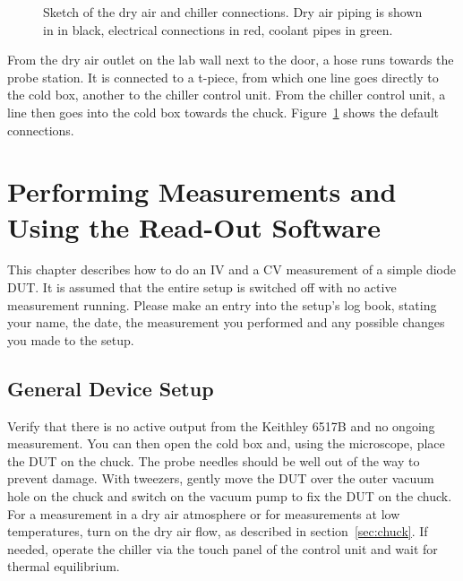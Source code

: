 \documentclass[a4paper]{article}
\begin{document}
\begin{figure}[hbtp!]
\caption[Dry Air and Chiller Connections]{Sketch of the dry air and chiller connections. Dry air piping is shown in in black, electrical connections in red, coolant pipes in green.}
\label{fig:dryair}
\end{figure}

From the dry air outlet on the lab wall next to the door, a hose runs towards the probe station.
It is connected to a t-piece, from which one line goes directly to the cold box, another to the chiller control unit.
From the chiller control unit, a line then goes into the cold box towards the chuck.
Figure~\ref{fig:dryair} shows the default connections.\\

\newpage

\section{Performing Measurements and Using the Read-Out Software}
\label{sec:meas}

This chapter describes how to do an IV and a CV measurement of a simple diode DUT.
It is assumed that the entire setup is switched off with no active measurement running.
Please make an entry into the setup's log book, stating your name, the date, the measurement you performed and any possible changes you made to the setup.\\

\subsection{General Device Setup}
\label{sec:devicesetup}

Verify that there is no active output from the Keithley 6517B and no ongoing measurement.
You can then open the cold box and, using the microscope, place the DUT on the chuck.
The probe needles should be well out of the way to prevent damage.
With tweezers, gently move the DUT over the outer vacuum hole on the chuck and switch on the vacuum pump to fix the DUT on the chuck.
For a measurement in a dry air atmosphere or for measurements at low temperatures, turn on the dry air flow, as described in section~\ref{sec:chuck}.
If needed, operate the chiller via the touch panel of the control unit and wait for thermal equilibrium.\\
\end{document}
